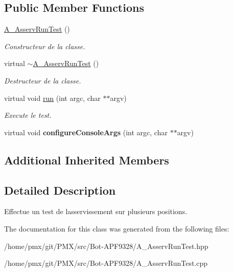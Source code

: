 \subsection*{Public Member Functions}
\begin{DoxyCompactItemize}
\item 
\mbox{\label{classA__AsservRunTest_a84b3220088aa0d46e87d5afd7b55d35f}} 
\hyperlink{classA__AsservRunTest_a84b3220088aa0d46e87d5afd7b55d35f}{A\+\_\+\+Asserv\+Run\+Test} ()
\begin{DoxyCompactList}\small\item\em Constructeur de la classe. \end{DoxyCompactList}\item 
\mbox{\label{classA__AsservRunTest_acfa804617293a9b4fabe0a67d17ec036}} 
virtual \hyperlink{classA__AsservRunTest_acfa804617293a9b4fabe0a67d17ec036}{$\sim$\+A\+\_\+\+Asserv\+Run\+Test} ()
\begin{DoxyCompactList}\small\item\em Destructeur de la classe. \end{DoxyCompactList}\item 
\mbox{\label{classA__AsservRunTest_a333d95553c334244fa2a1d63e5eba13a}} 
virtual void \hyperlink{classA__AsservRunTest_a333d95553c334244fa2a1d63e5eba13a}{run} (int argc, char $\ast$$\ast$argv)
\begin{DoxyCompactList}\small\item\em Execute le test. \end{DoxyCompactList}\item 
\mbox{\label{classA__AsservRunTest_aee96df6437a36ec4584d7e96853d9423}} 
virtual void {\bfseries configure\+Console\+Args} (int argc, char $\ast$$\ast$argv)
\end{DoxyCompactItemize}
\subsection*{Additional Inherited Members}


\subsection{Detailed Description}
Effectue un test de l\textquotesingle{}asservissement sur plusieurs positions. 

The documentation for this class was generated from the following files\+:\begin{DoxyCompactItemize}
\item 
/home/pmx/git/\+P\+M\+X/src/\+Bot-\/\+A\+P\+F9328/A\+\_\+\+Asserv\+Run\+Test.\+hpp\item 
/home/pmx/git/\+P\+M\+X/src/\+Bot-\/\+A\+P\+F9328/A\+\_\+\+Asserv\+Run\+Test.\+cpp\end{DoxyCompactItemize}

